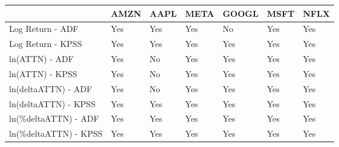 \begin{tabular}{lllllll}
\toprule
{} & AMZN & AAPL & META & GOOGL & MSFT & NFLX \\
\midrule
Log Return - ADF      &  Yes &  Yes &  Yes &    No &  Yes &  Yes \\
Log Return - KPSS     &  Yes &  Yes &  Yes &   Yes &  Yes &  Yes \\
ln(ATTN) - ADF        &  Yes &   No &  Yes &   Yes &  Yes &  Yes \\
ln(ATTN) - KPSS       &  Yes &   No &  Yes &   Yes &  Yes &  Yes \\
ln(deltaATTN) - ADF   &  Yes &   No &  Yes &   Yes &  Yes &  Yes \\
ln(deltaATTN) - KPSS  &  Yes &  Yes &  Yes &   Yes &  Yes &  Yes \\
ln(\%deltaATTN) - ADF  &  Yes &  Yes &  Yes &   Yes &  Yes &  Yes \\
ln(\%deltaATTN) - KPSS &  Yes &  Yes &  Yes &   Yes &  Yes &  Yes \\
\bottomrule
\end{tabular}
